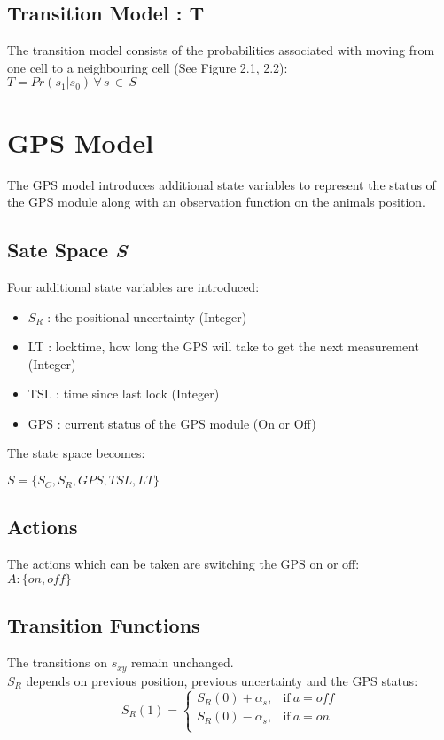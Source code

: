 \documentclass[12pt,openany,a4paper]{book}
\begin{document}
\subsection*{Transition Model : T}
The transition model consists of the probabilities associated with moving from one cell to a neighbouring cell (See Figure 2.1, 2.2): \\
\ensuremath{ T = Pr( s_1 | s_0) \,  \forall \,  s \, \in \, S }

\newpage

\section{GPS Model}
The GPS model introduces additional state variables to represent the status of the GPS module along with an observation function on the animals position.

\subsection*{Sate Space \emph{S}}
Four additional state variables are introduced:
\begin{itemize}
\item \ensuremath{S_{R}} : the positional uncertainty (Integer) 
\item LT : locktime, how long the GPS will take to get the next measurement (Integer)
\item TSL : time since last lock (Integer)
\item {GPS : current status of the GPS module (On or Off) } 
\end{itemize}
The state space becomes:

\ensuremath{ S = \{ S_{C} ,S_{R}, GPS, TSL, LT \}}

\subsection*{Actions}
The actions which can be taken are switching the GPS on or off: \\
\ensuremath{ A : \{on , off \} }

\subsection*{Transition Functions} %
The transitions on \ensuremath{ s_{xy}} remain unchanged. \\
\ensuremath{S_{R}}  depends on previous position, previous uncertainty and the GPS status:\\
  \begin{equation}
    S_{R}(1)=
    \begin{cases}
      S_{R}(0) + \alpha_s  , & \text{if}\ a={off} \\
      S_{R}(0) - \alpha_s  , & \text{if}\ a={on} \\
    \end{cases}
  \end{equation}
\end{document}
